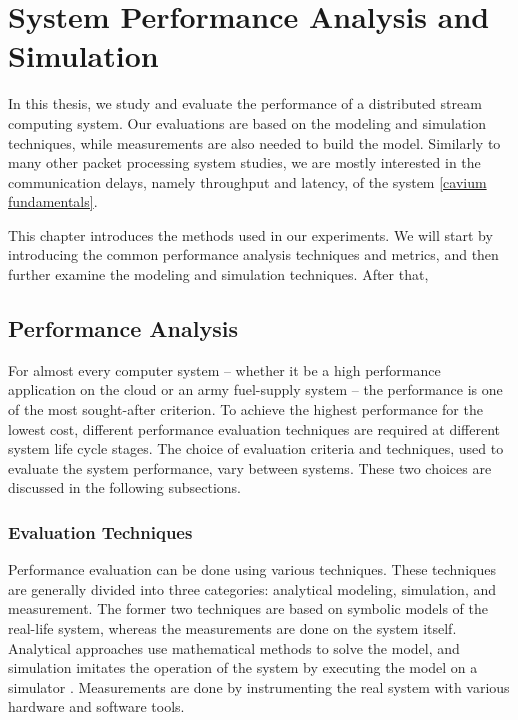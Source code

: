 \chapter{System Performance Analysis and Simulation}
\label{chapter:system-performance-analysis-and-simulation}
In this thesis, we study and evaluate the performance of a distributed stream computing system. Our evaluations are based on the modeling and simulation techniques, while measurements are also needed to build the model. Similarly to many other packet processing system studies, we are mostly interested in the communication delays, namely throughput and latency, of the system \ref{cavium fundamentals}.

This chapter introduces the methods used in our experiments. We will start by introducing the common performance analysis techniques and metrics, and then further examine the modeling and simulation techniques. After that, 

\section{Performance Analysis}
For almost every computer system -- whether it be a high performance application on the cloud \cite{jackson:2010:HPCOC} or an army fuel-supply system \cite{sabuncuoglu:2005:TAS} -- the performance is one of the most sought-after criterion. To achieve the highest performance for the lowest cost, different performance evaluation techniques are required at different system life cycle stages. The choice of evaluation criteria and techniques, used to evaluate the system performance, vary between systems. These two choices are discussed in the following subsections. \cite{jain:1991:AOCSPA}

\subsection{Evaluation Techniques}
Performance evaluation can be done using various techniques. These techniques are generally divided into three categories: analytical modeling, simulation, and measurement. The former two techniques are based on symbolic models of the real-life system, whereas the measurements are done on the system itself. Analytical approaches use mathematical methods to solve the model, and simulation imitates the operation of the system by executing the model on a simulator \cite{Banks:2010:DES}. Measurements are done by instrumenting the real system with various hardware and software tools. \cite{jain:1991:AOCSPA}

